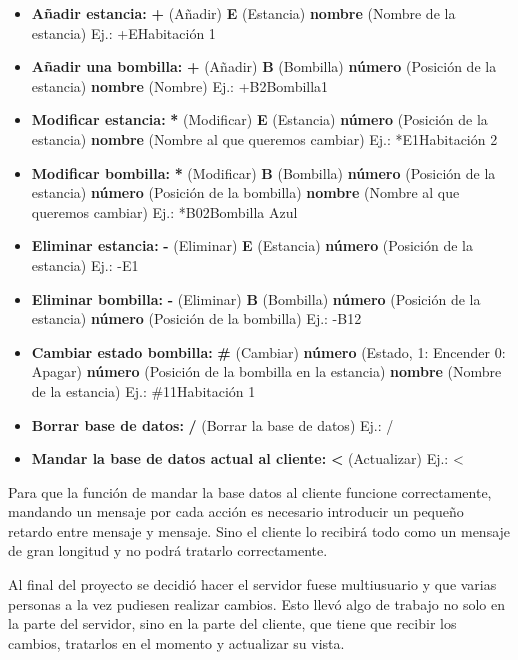 \begin{itemize}
	\item \textbf{Añadir estancia:} \textbf{+} (Añadir) \textbf{E} (Estancia) \textbf{nombre} (Nombre de la estancia) Ej.: +EHabitación 1
	\item \textbf{Añadir una bombilla:} \textbf{+} (Añadir) \textbf{B} (Bombilla) \textbf{número} (Posición de la estancia) \textbf{nombre} (Nombre) Ej.: +B2Bombilla1
	\item \textbf{Modificar estancia:} \textbf{*} (Modificar) \textbf{E} (Estancia) \textbf{número} (Posición de la estancia) \textbf{nombre} (Nombre al que queremos cambiar) Ej.: *E1Habitación 2
	\item \textbf{Modificar bombilla:} \textbf{*} (Modificar) \textbf{B} (Bombilla) \textbf{número} (Posición de la estancia) \textbf{número} (Posición de la bombilla) \textbf{nombre} (Nombre al que queremos cambiar) Ej.: *B02Bombilla Azul
	\item \textbf{Eliminar estancia:} \textbf{-} (Eliminar) \textbf{E} (Estancia) \textbf{número} (Posición de la estancia) Ej.: -E1
	\item \textbf{Eliminar bombilla:} \textbf{-} (Eliminar) \textbf{B} (Bombilla) \textbf{número} (Posición de la estancia) \textbf{número} (Posición de la bombilla) Ej.: -B12
	\item \textbf{Cambiar estado bombilla:} \textbf{\#} (Cambiar) \textbf{número} (Estado, 1: Encender 0: Apagar) \textbf{número} (Posición de la bombilla en la estancia) \textbf{nombre} (Nombre de la estancia) Ej.: \#11Habitación 1
	\item \textbf{Borrar base de datos:} \textbf{/} (Borrar la base de datos) Ej.: /
	\item \textbf{Mandar la base de datos actual al cliente:} \textbf{<} (Actualizar) Ej.: <
\end{itemize}

Para que la función de mandar la base datos al cliente funcione correctamente, mandando un mensaje por cada acción es necesario introducir un pequeño retardo entre mensaje y mensaje. Sino el cliente lo recibirá todo como un mensaje de gran longitud y no podrá tratarlo correctamente.

Al final del proyecto se decidió hacer el servidor fuese multiusuario y que varias personas a la vez pudiesen realizar cambios. Esto llevó algo de trabajo no solo en la parte del servidor, sino en la parte del cliente, que tiene que recibir los cambios, tratarlos en el momento y actualizar su vista.


